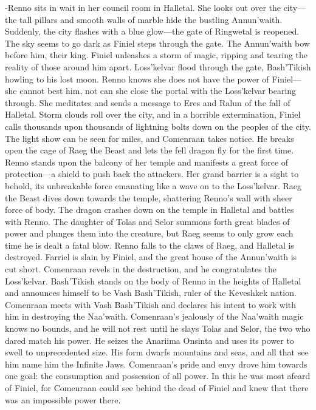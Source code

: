 \documentclass[smalldemyvopaper,11pt,twoside,onecolumn,openright,extrafontsizes]{memoir}
\begin{document}
{{-Renno sits in wait in her council room in Halletal. She looks out over the city—the tall pillars and smooth walls of marble hide the bustling Annun’waith. Suddenly, the city flashes with a blue glow—the gate of Ringwetal is reopened. The sky seems to go dark as Finiel steps through the gate. The Annun’waith bow before him, their king. Finiel unleashes a storm of magic, ripping and tearing the reality of those around him apart. Loss’kelvar flood through the gate, Bash’Tikish howling to his lost moon. Renno knows she does not have the power of Finiel—she cannot best him, not can she close the portal with the Loss’kelvar bearing through. She meditates and sends a message to Eres and Ralun of the fall of Halletal. Storm clouds roll over the city, and in a horrible extermination, Finiel calls thousands upon thousands of lightning bolts down on the peoples of the city. The light show can be seen for miles, and Comenraan takes notice. He breaks open the cage of Raeg the Beast and lets the fell dragon fly for the first time. Renno stands upon the balcony of her temple and manifests a great force of protection—a shield to push back the attackers. Her grand barrier is a sight to behold, its unbreakable force emanating like a wave on to the Loss’kelvar. Raeg the Beast dives down towards the temple, shattering Renno’s wall with sheer force of body. The dragon crashes down on the temple in Halletal and battles with Renno. The daughter of Tolas and Selor summons forth great blades of power and plunges them into the creature, but Raeg seems to only grow each time he is dealt a fatal blow. Renno falls to the claws of Raeg, and Halletal is destroyed. Farriel is slain by Finiel, and the great house of the Annun’waith is cut short. Comenraan revels in the destruction, and he congratulates the Loss’kelvar. Bash’Tikish stands on the body of Renno in the heights of Halletal and announces himself to be Vash Bash’Tikish, ruler of the Keveshkek nation. Comenraan meets with Vash Bash’Tikish and declares his intent to work with him in destroying the Naa’waith. Comenraan’s jealously of the Naa’waith magic knows no bounds, and he will not rest until he slays Tolas and Selor, the two who dared match his power. He seizes the Anariima Onsinta and uses its power to swell to unprecedented size. His form dwarfs mountains and seas, and all that see him name him the Infinite Jaws. Comenraan’s pride and envy drove him towards one goal: the consumption and possession of all power. In this he was most afeard of Finiel, for Comenraan could see behind the dead of Finiel and knew that there was an impossible power there.
}}
\end{document}
